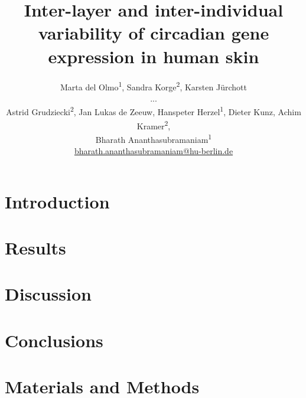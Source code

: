 \documentclass[twoside]{article} %
\title{
	Inter-layer and inter-individual variability of circadian gene expression in human skin} %
\author{%
	Marta del Olmo\textsuperscript{1}, Sandra Korge\textsuperscript{2}, Karsten J\"urchott \\[.1ex]
	...\\[.1ex]
	Astrid Grudziecki\textsuperscript{2}, Jan Lukas de Zeeuw, Hanspeter Herzel\textsuperscript{1}, Dieter Kunz, Achim Kramer\textsuperscript{2},\\[.1ex]
	Bharath Ananthasubramaniam\textsuperscript{1}\\[1ex]
\normalsize \href{mailto:bharath.ananthasubramaniam@hu-berlin.de}{bharath.ananthasubramaniam@hu-berlin.de} %
}
\date{} %
\begin{document}
\maketitle


\section{Introduction}



\section{Results}


\section{Discussion}


\section{Conclusions}

\listoftodos
\newpage
\section{Materials and Methods}

\newpage
\section*{}

\newpage
\setcounter{table}{0}
\setcounter{figure}{0}
\renewcommand{\thetable}{S\arabic{table}}%
\renewcommand{\thefigure}{S\arabic{figure}}%
\end{document}
